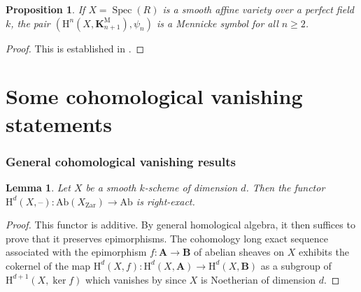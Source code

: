 \documentclass[11pt,leqno]{amsart}
\newcommand{\Spec}{\operatorname{Spec}}
\renewcommand{\1}{{\rm 1\hspace*{-0.4ex}%
\rule{0.1ex}{1.52ex}\hspace*{0.2ex}}}
\newcommand{\Zar}{\operatorname{Zar}} %
\newcommand{\K}{{{\mathbf K}}}
\newcommand{\KM}{\K^{\mathrm M}}
\newcommand{\Hr}{{\mathrm {H}}}
\newcommand{\<}[1]{{\langle}#1 {\rangle}}
\newcommand{\Abf}{\mathbf{A}}
\newcommand{\Bbf}{\mathbf{B}}
\newcommand{\Kbf}{\mathbf{K}}
\newcommand{\Mr}{\mathrm{M}}
\theoremstyle{plain}
\newtheorem{lem}[thm]{Lemma}
\newtheorem{prop}[thm]{Proposition}
\theoremstyle{definition}
\theoremstyle{remark}
\numberwithin{equation}{section}
\begin{document}
\begin{prop}\label{Milnor K-cohomology is a Mennicke symbol}
If $X=\Spec(R)$ is a smooth affine variety over a perfect field $k$, the pair $(\Hr^{n}(X,\KM_{n+1}),\psi_n)$ is a Mennicke symbol for all $n\ge 2$.
\end{prop}







\begin{proof}
This is established in \cite[proof of Theorem 4.1]{faselRemarksOrbitSets2010a}. 
\end{proof}




\section{Some cohomological vanishing statements}\label{section:cohomological_vanishing_statements}

\subsubsection*{General cohomological vanishing results}

\begin{lem}\label{lem:right_exactness_hd}
Let $X$ be a smooth $k$-scheme of dimension $d$. Then the functor $\Hr^d(X,\text{--}):\mathrm{Ab}(X_{\Zar})\to\mathrm{Ab}$ is right-exact.
\end{lem}

\begin{proof}
This functor is additive. By general homological algebra, it then suffices to prove that it preserves epimorphisms. The cohomology long exact sequence associated with the epimorphism $f:\Abf\rightarrow\Bbf$ of abelian sheaves on $X$ exhibits the cokernel of the map $\Hr^d(X,f):\Hr^d(X,\Abf)\to\Hr^d(X,\Bbf)$ as a subgroup of $\Hr^{d+1}(X,\ker f)$ which vanishes by \cite[Théorème 3.6.5]{grothendieckQuelquesPointsDalgebre1957} since $X$ is Noetherian of dimension $d$.
\end{proof}
\end{document}
